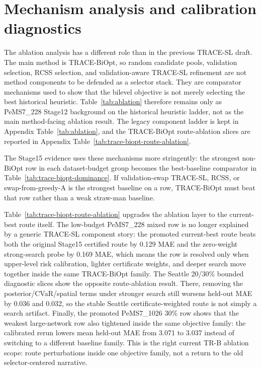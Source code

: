 \section{Mechanism analysis and calibration diagnostics}
\label{sec:mechanism}

The ablation analysis has a different role than in the previous TRACE-SL
draft. The main method is TRACE-BiOpt, so random candidate pools, validation
selection, RCSS selection, and validation-aware TRACE-SL refinement are not
method components to be defended as a selector stack. They are comparator
mechanisms used to show that the bilevel objective is not merely selecting the
best historical heuristic. Table~\ref{tab:ablation} therefore remains only as
PeMS7\_228 Stage12 background on the historical heuristic ladder, not as the
main method-facing ablation result. The legacy component ladder is kept in
Appendix Table~\ref{tab:ablation}, and the TRACE-BiOpt route-ablation slices
are reported in Appendix Table~\ref{tab:trace-biopt-route-ablation}.

The Stage15 evidence uses these mechanisms more stringently: the strongest
non-BiOpt row in each dataset-budget group becomes the best-baseline comparator
in Table~\ref{tab:trace-biopt-dominance}. If validation-swap TRACE-SL, RCSS,
or swap-from-greedy-A is the strongest baseline on a row, TRACE-BiOpt must
beat that row rather than a weak straw-man baseline.

Table~\ref{tab:trace-biopt-route-ablation} upgrades the ablation layer to the
current-best route itself. The low-budget PeMS7\_228 mixed row is no longer
explained by a generic TRACE-SL component story: the promoted current-best
route beats both the original Stage15 certified route by 0.129 MAE and the
zero-weight strong-search probe by 0.169 MAE, which means the row is resolved
only when upper-level risk calibration, lighter certificate weights, and
deeper search move together inside the same TRACE-BiOpt family. The Seattle
20/30\% bounded diagnostic slices show the opposite route-ablation result.
There, removing the posterior/CVaR/spatial terms under stronger search still
worsens held-out MAE by 0.036 and 0.032, so the stable Seattle
certificate-weighted route is not simply a search artifact. Finally, the
promoted PeMS7\_1026 30\% row shows that the weakest
large-network row also tightened inside the same objective family: the
calibrated rerun lowers mean held-out MAE from 3.071 to 3.037 instead of
switching to a different baseline family. This is the right current TR-B
ablation scope: route perturbations inside one objective family, not a
return to the old selector-centered narrative.

